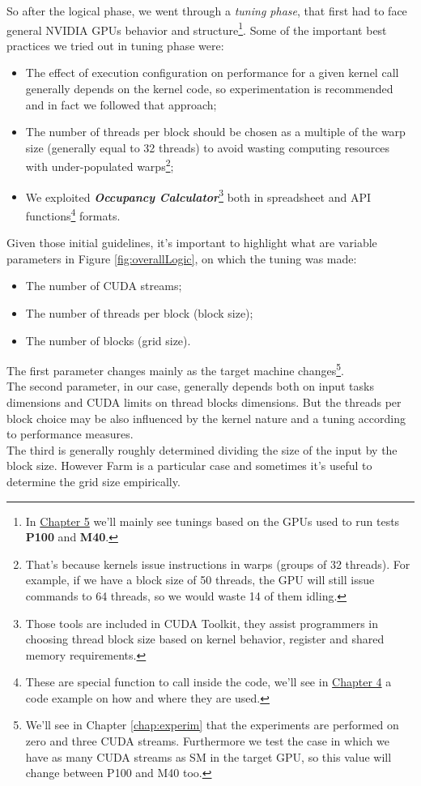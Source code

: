 	So after the logical phase, we went through a \textit{tuning phase}, that first had to face general NVIDIA GPUs behavior and structure\footnote{In \hyperref[chap:experim]{Chapter 5} we'll mainly see tunings based on the GPUs used to run tests \textendash \textbf{P100} and \textbf{M40}.}.
	Some of the important best practices we tried out in tuning phase were:

	\begin{itemize}
		\item The effect of execution configuration on performance for a given kernel call generally
		depends on the kernel code, so experimentation is recommended and in fact we followed that approach;
		\item The number of threads per block should be chosen as a multiple of the warp size (generally equal to 32 threads) to avoid wasting computing resources with under-populated warps\footnote{That's because kernels issue instructions in warps (groups of 32 threads). For example, if we have a block size of 50 threads, the GPU will still issue commands to 64 threads, so we would waste 14 of them idling.};
		\item We exploited \textbf{\textit{Occupancy Calculator}}\footnote{Those tools are included in CUDA Toolkit, they assist programmers in choosing thread block size based on kernel behavior, register and shared memory requirements.} both in spreadsheet and API functions\footnote{These are special function to call inside the code, we'll see in \hyperref[chap:impl]{Chapter 4} a code example on how and where they are used.} formats\cite{cudaguide}.
		 
	\end{itemize}

	Given those initial guidelines, it's important to highlight what are variable parameters in Figure \ref{fig:overallLogic}, on which the tuning was made:
	\begin{itemize}
		\item The number of CUDA streams;		
		\item The number of threads per block (block size);
		\item The number of blocks (grid size).
	\end{itemize}
	The first parameter changes mainly as the target machine changes\footnote{We'll see in Chapter \ref{chap:experim} that the experiments are performed on zero and three CUDA streams. Furthermore we test the case in which we have as many CUDA streams as SM in the target GPU, so this value will change between P100 and M40 too.}.\\
	The second parameter, in our case, generally depends both on input tasks dimensions and CUDA limits on thread blocks dimensions. But the threads per block choice may be also influenced by the kernel nature and a tuning according to performance measures.\\
	The third is generally roughly determined dividing the size of the input by the block size. However Farm is a particular case and sometimes it's useful to determine the grid size empirically.\\
	
